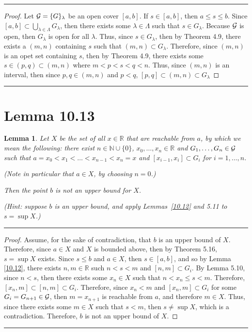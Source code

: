 \documentclass[openany, amssymb, psamsfonts]{amsart}
\newcommand{\bbN}{\mathbb{N}}
\newcommand{\bbR}{\mathbb{R}}
\newtheorem{lem}{Lemma}[section]
\theoremstyle{definition}
\numberwithin{equation}{section}
\begin{document}
\vspace{4pt}     \hrule   \vspace{4pt}\begin{proof}
Let $\mathcal G = \{G\}_\lambda$ be an open cover $[a,b]$. If $s\in [a,b]$, then $a\leq s\leq b$. Since $[a,b]\subset \bigcup_{\lambda \in \Lambda}G_\lambda$, then there exists some $\lambda \in \Lambda$ such that $s\in G_\lambda$. Because $\mathcal G$ is open, then $G_\lambda$ is open for all $\lambda$. Thus, since $s\in G_\lambda$, then by Theorem 4.9, there exists a $(m,n)$ containing $s$ such that $(m,n)\subset G_\lambda$. Therefore, since $(m,n)$ is an opet set containing $s$, then by Theorem 4.9, there exists some $s\in (p,q)\subset (m,n)$ where $m<p<s<q<n$. Thus, since $(m,n)$ is an interval, then since $p,q\in (m,n)$ and $p<q$, $[p,q]\subset (m,n)\subset G_\lambda$
\end{proof}\vspace{4pt}     \hrule   \vspace{4pt}

\section*{Lemma 10.13}
\begin{lem}
\label{10.13}
Let $X$ be the set of all $x\in \bbR$ that are \emph{reachable from $a$}, by which we mean the following: there exist $n\in\bbN\cup\{0\}$, $x_0,\ldots,x_n\in \bbR$ and $G_1,\ldots,G_n\in\mathcal G$ such that $a=x_0<x_1<\ldots<x_{n-1}<x_n=x$ and $[x_{i-1},x_i]\subset G_i$ for $i=1,\ldots,n$.

(Note in particular that $a\in X$, by choosing $n=0$.)

Then the point $b$ is not an upper bound for $X$.

(Hint: suppose $b$ is an upper bound, and apply Lemmas~\ref{10.12} and 5.11 to $s=\sup X$.)
\end{lem}

\vspace{4pt}     \hrule   \vspace{4pt}\begin{proof}
Assume, for the sake of contradiction, that $b$ is an upper bound of $X$. Therefore, since $a\in X$ and $X$ is bounded above, then by Theorem 5.16,  $s=\sup X$ exists. Since $s\leq b$ and $a\in X$, then $s\in [a,b]$, and so by Lemma \ref{10.12}, there exists $n,m \in \bbR$ such $n<s<m$ and $[n,m]\subset G_i$. By Lemma 5.10, since $n<s$, then there exists some $x_n\in X$ such that $n<x_n\leq s<m$. Therefore, $[x_n,m]\subset [n,m]\subset G_i$. Therefore, since $x_n<m$ and $[x_n,m]\subset G_i$ for some $G_i = G_{n+1}\in \mathcal G$, then $m=x_{n+1}$ is reachable from $a$, and therefore $m\in X$. Thus, since there exists some $m\in X$ such that $s<m$, then $s\neq \sup X$, which is a contradiction. Therefore, $b$ is not an upper bound of $X$. 
\end{proof}\vspace{4pt}     \hrule   \vspace{4pt}
\end{document}
